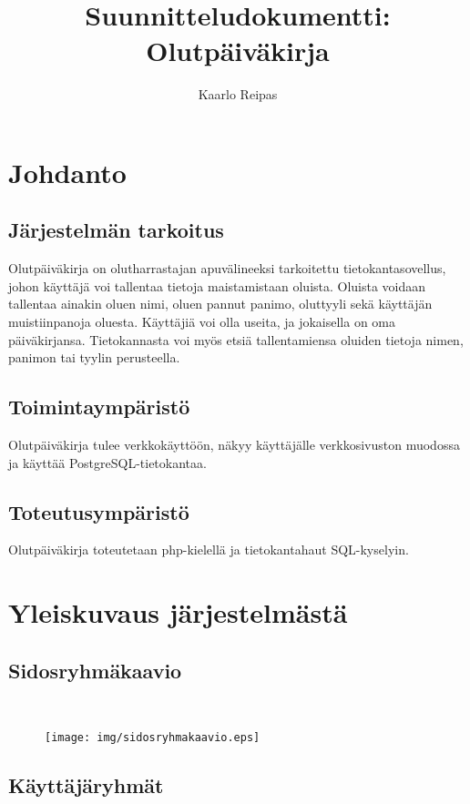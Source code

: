 \documentclass[12pt]{amsart}
\title{Suunnitteludokumentti: Olutpäiväkirja}
\author{Kaarlo Reipas}
\begin{document}
\maketitle

\sloppy

\section{Johdanto}
\label{sec:johdanto}

\subsection{Järjestelmän tarkoitus}

Olutpäiväkirja on olutharrastajan apuvälineeksi tarkoitettu tietokantasovellus, johon käyttäjä voi tallentaa tietoja maistamistaan oluista. Oluista voidaan tallentaa ainakin oluen nimi, oluen pannut panimo, oluttyyli sekä käyttäjän muistiinpanoja oluesta. Käyttäjiä voi olla useita, ja jokaisella on oma päiväkirjansa. Tietokannasta voi myös etsiä tallentamiensa oluiden tietoja nimen, panimon tai tyylin perusteella.

\subsection{Toimintaympäristö}

Olutpäiväkirja tulee verkkokäyttöön, näkyy käyttäjälle verkkosivuston muodossa ja käyttää PostgreSQL-tietokantaa.

\subsection{Toteutusympäristö}

Olutpäiväkirja toteutetaan php-kielellä ja tietokantahaut SQL-kyselyin.

\section{Yleiskuvaus järjestelmästä}

\subsection{Sidosryhmäkaavio}
\ 
\begin{figure}[H]
  \centering
  \texttt{[image: img/sidosryhmakaavio.eps]}
\end{figure}

\subsection{Käyttäjäryhmät}
\end{document}
